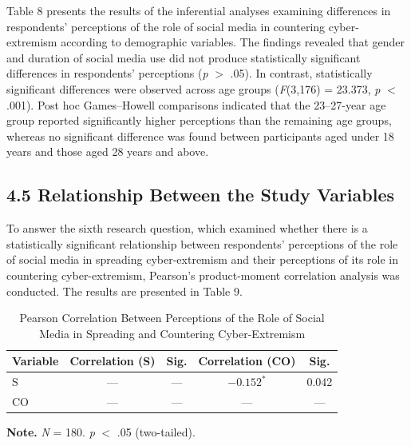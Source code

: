 \documentclass[10pt]{NSP1}
\begin{document}
	Table 8 presents the results of the inferential analyses examining differences in respondents' perceptions of the role of social media in countering cyber-extremism according to demographic variables. The findings revealed that gender and duration of social media use did not produce statistically significant differences in respondents' perceptions (\textit{p} $>$ .05). In contrast, statistically significant differences were observed across age groups (\textit{F}(3,176) = 23.373, \textit{p} $<$ .001). Post hoc Games–Howell comparisons indicated that the 23–27-year age group reported significantly higher perceptions than the remaining age groups, whereas no significant difference was found between participants aged under 18 years and those aged 28 years and above.
	
	\subsection*{4.5 Relationship Between the Study Variables}
	
	To answer the sixth research question, which examined whether there is a statistically significant relationship between respondents' perceptions of the role of social media in spreading cyber-extremism and their perceptions of its role in countering cyber-extremism, Pearson's product-moment correlation analysis was conducted. The results are presented in Table 9.
	
	\setcounter{table}{8}
	\begin{table}[H]
		\centering
		\caption{Pearson Correlation Between Perceptions of the Role of Social Media in Spreading and Countering Cyber-Extremism}
		\small
		\renewcommand{\arraystretch}{1.3}
		\begin{tabular}{|l|c|c|c|c|}
			\hline
			\textbf{Variable} & \textbf{Correlation (S)} & \textbf{Sig.} & \textbf{Correlation (CO)} & \textbf{Sig.} \\
			\hline
			S & --- & --- & $-0.152^{*}$ & 0.042 \\
			CO & --- & --- & --- & --- \\
			\hline
		\end{tabular}
	\end{table}
	
	\noindent\textbf{Note.} \textit{N} = 180. \textit{p} $<$ .05 (two-tailed).
	
\end{document}
